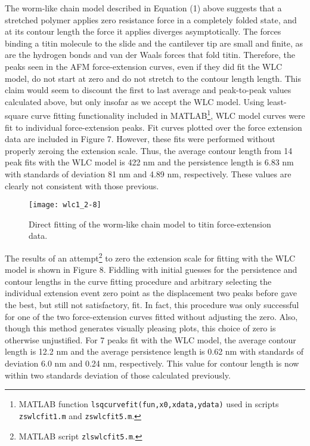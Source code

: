 \documentclass{article}
\begin{document}
The worm-like chain model described in Equation (1) above suggests that a stretched
polymer applies zero resistance force in a completely folded state, and at its contour
length the force it applies diverges asymptotically. The forces binding a titin molecule to
the slide and the cantilever tip are small and finite, as are the hydrogen bonds and van
der Waals forces that fold titin. Therefore, the peaks seen in the AFM force-extension
curves, even if they did fit the WLC model, do not start at zero and do not stretch to the
contour length length. This claim would seem to discount the first to last average and
peak-to-peak values calculated above, but only insofar as we accept the WLC model.
Using least-square curve fitting functionality included in
MATLAB\footnote{MATLAB function \texttt{lsqcurvefit(fun,x0,xdata,ydata)} used in
scripts \texttt{zs\textunderscore wlcfit1.m} and \texttt{zs\textunderscore wlcfit5.m}.},
WLC model curves were fit to individual force-extension peaks. Fit curves plotted over
the force extension data are included in Figure 7. However, these fits were performed without
properly zeroing the extension scale. Thus, the average contour length from 14 peak fits
with the WLC model is 422 nm and the persistence length is 6.83 nm with standards of 
deviation 81 nm and 4.89 nm, respectively. These values are 
clearly  not consistent with those previous.

\begin{figure}[H]
\texttt{[image: wlc1\_2-8]}
\centering
\caption{Direct fitting of the worm-like chain model to titin force-extension data.}
\end{figure}

The results of an attempt\footnote{MATLAB script \texttt{zls\textunderscore wlcfit5.m}.}
to zero the extension scale for fitting with the WLC model 
is shown in Figure 8. Fiddling with initial guesses for the persistence and contour lengths
in the curve fitting procedure and arbitrary selecting the individual extension event zero 
point as the displacement two peaks before gave the best, but still not satisfactory, fit.
In fact, this procedure was only successful for one of the two force-extension curves
fitted without adjusting the zero. Also, though this method generates visually pleasing
plots, this choice of zero is otherwise unjustified. For 7 peaks fit with the WLC model, the
average contour length is 12.2 nm and the average persistence length is 0.62 nm with
standards of deviation 6.0 nm and 0.24 nm, respectively. This value for contour length
is now within two standards deviation of those calculated previously.
\end{document}
